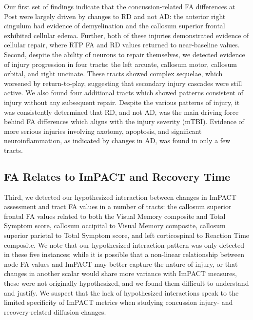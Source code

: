 \documentclass[12pt]{article}
\begin{document}
Our first set of findings indicate that the concussion-related FA differences at Post were largely driven by changes to RD and not AD: the anterior right cingulum had evidence of demyelination and the callosum superior frontal exhibited cellular edema. Further, both of these injuries demonstrated evidence of cellular repair, where RTP FA and RD values returned to near-baseline values. Second, despite the ability of neurons to repair themselves, we detected evidence of injury progression in four tracts: the left arcuate, callosum motor, callosum orbital, and right uncinate. These tracts showed complex sequelae, which worsened by return-to-play, suggesting that secondary injury cascades were still active. We also found four additional tracts which showed patterns consistent of injury without any subsequent repair. Despite the various patterns of injury, it was consistently determined that RD, and not AD, was the main driving force behind FA differences which aligns with the injury severity (mTBI). Evidence of more serious injuries involving axotomy, apoptosis, and significant neuroinflammation, as indicated by changes in AD, was found in only a few tracts.


\subsection{FA Relates to ImPACT and Recovery Time}
\label{ssec:disc-impact}
Third, we detected our hypothesized interaction between changes in ImPACT assessment and tract FA values in a number of tracts: the callosum superior frontal FA values related to both the Visual Memory composite and Total Symptom score, callosum occipital to Visual Memory composite, callosum superior parietal to Total Symptom score, and left corticospinal to Reaction Time composite. We note that our hypothesized interaction pattern was only detected in these five instances; while it is possible that a non-linear relationship between node FA values and ImPACT may better capture the nature of injury, or that changes in another scalar would share more variance with ImPACT measures, these were not originally hypothesized, and we found them difficult to understand and justify. We suspect that the lack of hypothesized interactions speak to the limited specificity of ImPACT metrics \parencite{schatz2013SensitivitySpecificityOnline} when studying concussion injury- and recovery-related diffusion changes.
\end{document}
